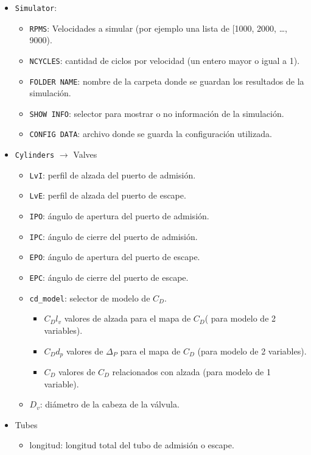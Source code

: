 \begin{itemize}
  \item {\tt Simulator}:
        \begin{itemize}
          \item {\tt RPMS}: Velocidades a simular (por ejemplo una lista de [1000,
2000, \ldots, 9000).
          \item {\tt NCYCLES}: cantidad de ciclos por velocidad (un entero mayor o igual a 1).
          \item {\tt FOLDER NAME}: nombre de la carpeta donde se guardan los
resultados de la simulación.
          \item {\tt SHOW INFO}: selector para mostrar o no información de la simulación.
          \item {\tt CONFIG DATA}: archivo donde se guarda la configuración utilizada.
        \end{itemize}
  \item {\tt Cylinders} $\longrightarrow$ Valves
        \begin{itemize}
          \item {\tt LvI}: perfil de alzada del puerto de admisión.
          \item {\tt LvE}: perfil de alzada del puerto de escape.
          \item {\tt IPO}: ángulo de apertura del puerto de admisión.
          \item {\tt IPC}: ángulo de cierre del puerto de admisión.
          \item {\tt EPO}: ángulo de apertura del puerto de escape.
          \item {\tt EPC}: ángulo de cierre del puerto de escape.
          \item {\tt cd\_model}: selector de modelo de $C_{D}$.
                \begin{itemize}
                  \item $C_{D}l_{v}$ valores de alzada para el mapa de $C_{D}$(
para modelo de 2 variables).
                  \item $C_{D}d_{p}$ valores de $\Delta_{P}$ para el mapa de
$C_{D}$ (para modelo de 2 variables).
                  \item $C_{D}$ valores de $C_{D}$ relacionados con alzada (para modelo de 1 variable).
                \end{itemize}
          \item $D_{v}$: diámetro de la cabeza de la válvula.
        \end{itemize}
  \item Tubes
        \begin{itemize}
          \item longitud: longitud total del tubo de admisión o escape.
        \end{itemize}
\end{itemize}

